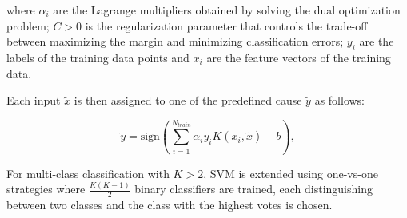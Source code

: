 where $\alpha_i$ are the Lagrange multipliers obtained by solving the dual optimization problem; $C > 0$ is the regularization parameter that controls the trade-off between maximizing the margin and minimizing classification errors; $y_i$ are the labels of the training data points and $x_i$ are the feature vectors of the training data.

Each input $\tilde{x}$ is then assigned to one of the predefined cause $\tilde{y}$ as follows:

\begin{equation}
    \tilde{y} = \text{sign}(\sum_{i=1}^{N_{train}} \alpha_i y_i K(x_i, \tilde{x}) + b),
\end{equation}

For multi-class classification with $K > 2$, SVM is extended using one-vs-one strategies where $\frac{K(K-1)}{2}$ binary classifiers are trained, each distinguishing between two classes and the class with the highest votes is chosen. 





